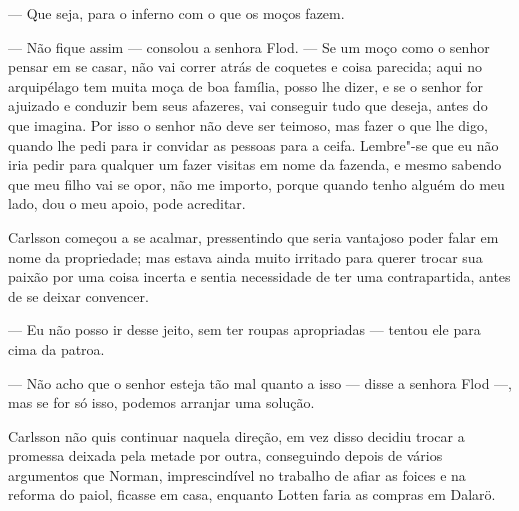 --- Que seja, para o inferno com o que os moços fazem.

--- Não fique assim --- consolou a senhora Flod. --- Se um moço como o senhor pensar em se
casar, não vai correr atrás de coquetes e coisa parecida; aqui no arquipélago
tem muita moça de boa família, posso lhe dizer, e se o senhor for ajuizado e
conduzir bem seus afazeres, vai conseguir tudo que deseja, antes do que imagina.
Por isso o senhor não deve ser teimoso, mas fazer o que lhe digo, quando lhe pedi
para ir convidar as pessoas para a ceifa. Lembre"-se que eu não iria pedir para
qualquer um fazer visitas em nome da fazenda, e mesmo sabendo que meu filho vai
se opor, não me importo, porque quando tenho alguém do meu lado, dou o
meu apoio, pode acreditar.

Carlsson começou a se acalmar, pressentindo que seria vantajoso poder falar em
nome da propriedade; mas estava ainda muito irritado para querer trocar sua
paixão por uma coisa incerta e sentia necessidade de ter uma contrapartida,
antes de se deixar convencer.

--- Eu não posso ir desse jeito, sem ter roupas apropriadas --- tentou ele para
cima da patroa.

--- Não acho que o senhor esteja tão mal quanto a isso --- disse a senhora Flod
---, mas se for só isso, podemos arranjar uma solução.

Carlsson não quis continuar naquela direção, em vez disso decidiu trocar a
promessa deixada pela metade por outra, conseguindo depois de vários argumentos
que Norman, imprescindível no trabalho de afiar as foices e
na reforma do paiol, ficasse em casa, enquanto Lotten faria as compras em
Dalarö.

 \asterisc

